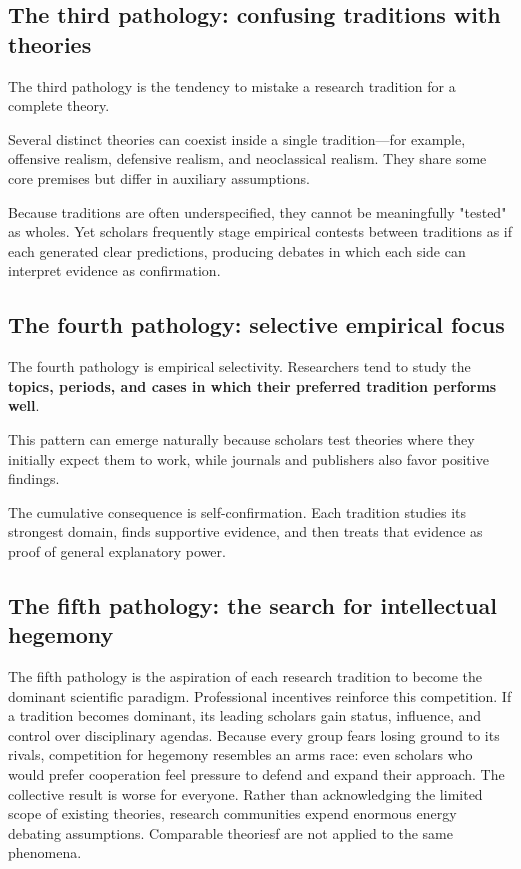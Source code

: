\subsection{The third pathology: confusing traditions with
theories}

The third pathology is the tendency to mistake a research tradition for
a complete theory. 

Several distinct theories can coexist inside a single tradition---for example, offensive realism, defensive realism, and neoclassical realism. They share some core premises but differ in auxiliary assumptions.

Because traditions are often underspecified, they cannot be meaningfully "tested" as wholes. Yet scholars frequently stage empirical contests between traditions as if each generated clear predictions, producing debates in which each side can interpret evidence as confirmation.

\subsection{The fourth pathology: selective empirical
focus}

The fourth pathology is empirical selectivity. Researchers tend to study
the \textbf{topics, periods, and cases in which their preferred tradition performs well}.

This pattern can emerge naturally because scholars test theories where they initially expect them to work, while journals and publishers also favor positive findings. 

The cumulative consequence is self-confirmation. Each tradition studies its strongest domain, finds supportive evidence, and then treats that evidence as proof of general explanatory power.

\subsection{The fifth pathology: the search for intellectual
hegemony}

The fifth pathology is the aspiration of each research tradition to
become the dominant scientific paradigm.
Professional incentives reinforce this competition. If a tradition
becomes dominant, its leading scholars gain status, influence, and
control over disciplinary agendas. Because every group fears losing
ground to its rivals, competition for hegemony resembles an arms race:
even scholars who would prefer cooperation feel pressure to defend and
expand their approach. The collective result is worse for everyone.
Rather than acknowledging the limited scope of existing theories,
research communities expend enormous energy debating assumptions. Comparable theoriesf are not applied to the same phenomena.

